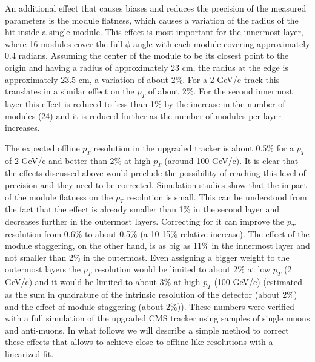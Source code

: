 \documentclass[10pt,a4paper]{report}
\begin{document}
An additional effect that causes biases and reduces the precision of the measured parameters is the module flatness, which causes a variation of the radius of the hit inside a single module. This effect is most important for the innermost layer, where 16 modules cover the full $\phi$ angle with each module covering approximately 0.4 radians. Assuming the center of the module to be its closest point to the origin and having a radius of approximately 23 cm, the radius at the edge is approximately 23.5 cm, a variation of about 2\%. For a 2 GeV/c track this translates in a similar effect on the $p_T$ of about 2\%. For the second innermost layer this effect is reduced to less than 1\% by the increase in the number of modules (24) and it is reduced further as the number of modules per layer increases.

The expected offline $p_T$ resolution in the upgraded tracker is about 0.5\% for a $p_T$ of 2 GeV/c and better than 2\% at high $p_T$ (around 100 GeV/c). It is clear that the effects discussed above would preclude the possibility of reaching this level of precision and they need to be corrected. Simulation studies show that the impact of the module flatness on the $p_T$ resolution is small. This can be understood from the fact that the effect is already smaller than 1\% in the second layer and decreases further in the outermost layers. Correcting for it can improve the $p_T$ resolution from 0.6\% to about 0.5\% (a 10-15\% relative increase). The effect of the module staggering, on the other hand, is as big as 11\% in the innermost layer and not smaller than 2\% in the outermost. Even assigning a bigger weight to the outermost layers the $p_T$ resolution would be limited to about 2\% at low $p_T$ (2 GeV/c) and it would be limited to about 3\% at high $p_T$ (100 GeV/c) (estimated as the sum in quadrature of the intrinsic resolution of the detector (about 2\%) and the effect of module staggering (about 2\%)). These numbers were verified with a full simulation of the upgraded CMS tracker using samples of single muons and anti-muons. In what follows we will describe a simple method to correct these effects that allows to achieve close to offline-like resolutions with a linearized fit.
\end{document}
